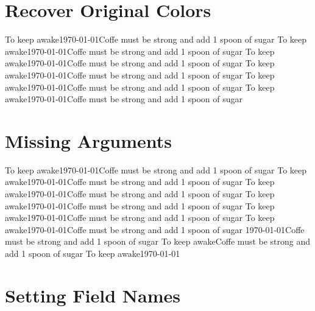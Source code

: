 \documentclass[12pt,a4paper]{article}
\begin{document}
\section{Recover Original Colors}


%
{To keep awake}{\today}{Coffe must be strong and add 1 spoon of sugar}
%
{To keep awake}{\today}{Coffe must be strong and add 1 spoon of sugar}
%
{To keep awake}{\today}{Coffe must be strong and add 1 spoon of sugar}
%
{To keep awake}{\today}{Coffe must be strong and add 1 spoon of sugar}
%
{To keep awake}{\today}{Coffe must be strong and add 1 spoon of sugar}
%
{To keep awake}{\today}{Coffe must be strong and add 1 spoon of sugar}

\section{Missing Arguments}
%
{To keep awake}{\today}{Coffe must be strong and add 1 spoon of sugar}
%
{To keep awake}{\today}{Coffe must be strong and add 1 spoon of sugar}
%
{To keep awake}{\today}{Coffe must be strong and add 1 spoon of sugar}
%
{To keep awake}{\today}{Coffe must be strong and add 1 spoon of sugar}
%
{To keep awake}{\today}{Coffe must be strong and add 1 spoon of sugar}
%
{To keep awake}{\today}{Coffe must be strong and add 1 spoon of sugar}
%
{}{\today}{Coffe must be strong and add 1 spoon of sugar}
%
{To keep awake}{}{Coffe must be strong and add 1 spoon of sugar}
%
{To keep awake}{\today}{}

\section{Setting Field Names}
\end{document}
